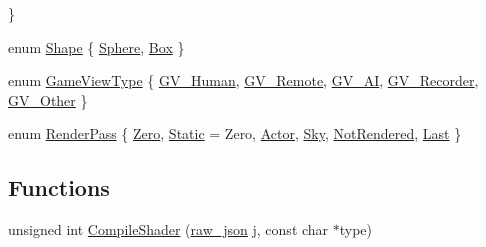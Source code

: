 \begin{DoxyCompactItemize}
 \}
\item 
enum \hyperlink{namespaceTarbora_ae465acce25913e46aa412ce0fb100d6d}{Shape} \{ \hyperlink{namespaceTarbora_ae465acce25913e46aa412ce0fb100d6dacf01437461ee1c3bed5f0aff629a2027}{Sphere}, 
\hyperlink{namespaceTarbora_ae465acce25913e46aa412ce0fb100d6da139e58b5829f7f9624c775057b55dc4b}{Box}
 \}
\item 
enum \hyperlink{namespaceTarbora_ac0cedfc0c39d9fd73f8c6de68505ed23}{Game\+View\+Type} \{ \newline
\hyperlink{namespaceTarbora_ac0cedfc0c39d9fd73f8c6de68505ed23a33e16a08ddd4ad61dc49051f6a306e08}{G\+V\+\_\+\+Human}, 
\hyperlink{namespaceTarbora_ac0cedfc0c39d9fd73f8c6de68505ed23a0563d052e559e1e25e27ee886d3231f4}{G\+V\+\_\+\+Remote}, 
\hyperlink{namespaceTarbora_ac0cedfc0c39d9fd73f8c6de68505ed23adae506ffe5fa6a387d6ba96c0576ce4b}{G\+V\+\_\+\+AI}, 
\hyperlink{namespaceTarbora_ac0cedfc0c39d9fd73f8c6de68505ed23ab47b589700f696b7fa04ef0e28f3af91}{G\+V\+\_\+\+Recorder}, 
\newline
\hyperlink{namespaceTarbora_ac0cedfc0c39d9fd73f8c6de68505ed23a1da04964fd5138129a99b3e8e6a089e0}{G\+V\+\_\+\+Other}
 \}
\item 
enum \hyperlink{namespaceTarbora_a78130409269d85fb6cb9311cf3ccec0d}{Render\+Pass} \{ \newline
\hyperlink{namespaceTarbora_a78130409269d85fb6cb9311cf3ccec0da408ed0037f28d3fc2605954c43c72a72}{Zero}, 
\hyperlink{namespaceTarbora_a78130409269d85fb6cb9311cf3ccec0da41789d59025b078c940457370dd84b91}{Static} = Zero, 
\hyperlink{namespaceTarbora_a78130409269d85fb6cb9311cf3ccec0da7d9263f4354db57447beb804f725f4e3}{Actor}, 
\hyperlink{namespaceTarbora_a78130409269d85fb6cb9311cf3ccec0dab3b0cb7e9a82264bad2e7e898e90d49b}{Sky}, 
\newline
\hyperlink{namespaceTarbora_a78130409269d85fb6cb9311cf3ccec0da24317c0d13120fcf05078dc961bb9b64}{Not\+Rendered}, 
\hyperlink{namespaceTarbora_a78130409269d85fb6cb9311cf3ccec0daac584e817c7a5f27edafbd249b18adb2}{Last}
 \}
\end{DoxyCompactItemize}
\subsection*{Functions}
\begin{DoxyCompactItemize}
\item 
unsigned int \hyperlink{namespaceTarbora_a4670fe58329d440f3622b980acab59ed}{Compile\+Shader} (\hyperlink{Shader_8cpp_a6c714f7f62aad8e7c7adf29f3247c2ac}{raw\+\_\+json} j, const char $\ast$type)
\end{DoxyCompactItemize}


